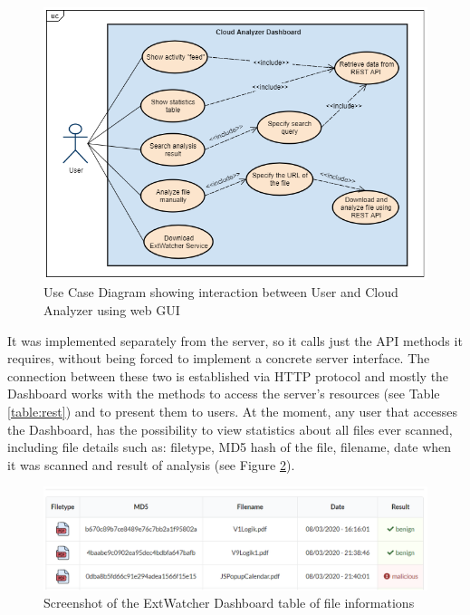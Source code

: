 \begin{figure}[H]
	\centerline{\includegraphics[scale=0.7]{figures/usecaseGUI.png}}  
	\caption{Use Case Diagram showing interaction between User and Cloud Analyzer using web GUI}
	\label{usecase}
\end{figure}

It was implemented separately from the server, so it calls just the API methods it requires, without being forced to implement a concrete server interface. The connection between these two is established via HTTP protocol and mostly the Dashboard works with the  methods to access the server's resources (see Table \ref{table:rest}) and to present them to users. At the moment, any user that accesses the Dashboard, has the possibility to view statistics about all files ever scanned, including file details such as: filetype, MD5 hash of the file, filename, date when it was scanned and result of analysis (see Figure \ref{screenshot:infotable}). 

\begin{figure}[H]
	\centerline{\includegraphics[scale=0.6]{figures/infotable.png}}  
	\caption{Screenshot of the ExtWatcher Dashboard table of file informations}
	\label{screenshot:infotable}
\end{figure}

